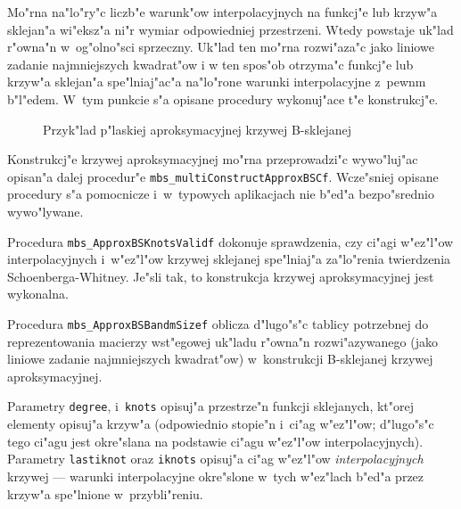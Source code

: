 \begin{sloppypar}
Mo"rna na"lo"ry"c liczb"e warunk"ow interpolacyjnych na funkcj"e lub krzyw"a
sklejan"a wi"eksz"a ni"r wymiar odpowiedniej przestrzeni. Wtedy powstaje
uk"lad r"owna"n w~og"olno"sci sprzeczny. Uk"lad ten mo"rna rozwi"aza"c jako
liniowe zadanie najmniejszych kwadrat"ow i w ten spos"ob otrzyma"c funkcj"e
lub krzyw"a sklejan"a spe"lniaj"ac"a na"lo"rone warunki interpolacyjne
z~pewnm b"l"edem. W~tym punkcie s"a opisane procedury wykonuj"ace t"e
konstrukcj"e.
\end{sloppypar}

\begin{figure}[ht]
  \centerline{}
  \caption{Przyk"lad p"laskiej aproksymacyjnej krzywej B-sklejanej}
\end{figure}
Konstrukcj"e krzywej aproksymacyjnej mo"rna przeprowadzi"c wywo"luj"ac
opisan"a dalej procedur"e \texttt{mbs\_multiConstructApproxBSCf}. Wcze"sniej
opisane procedury s"a pomocnicze i~w~typowych aplikacjach nie b"ed"a
bezpo"srednio wywo"lywane.

\vspace{\bigskipamount}
\begin{sloppypar}
Procedura \texttt{mbs\_ApproxBSKnotsValidf} dokonuje sprawdzenia, czy ci"agi
w"ez\-"l"ow interpolacyjnych i~w"ez"l"ow krzywej sklejanej spe"lniaj"a
za"lo"renia twierdzenia Schoenberga-Whitney. Je"sli tak, to konstrukcja
krzywej aproksymacyjnej jest wykonalna.
\end{sloppypar}

\vspace{\bigskipamount}
Procedura \texttt{mbs\_ApproxBSBandmSizef} oblicza d"lugo"s"c tablicy
potrzebnej do reprezentowania macierzy wst"egowej uk"ladu r"owna"n
rozwi"azywanego (jako liniowe zadanie najmniejszych kwadrat"ow)
w~konstrukcji B-sklejanej krzywej aproksymacyjnej.

Parametry \texttt{degree}, i~\texttt{knots} opisuj"a
przestrze"n funkcji sklejanych, kt"orej elementy opisuj"a krzyw"a
(odpowiednio stopie"n i~ci"ag w"ez"l"ow; d"lugo"s"c tego ci"agu jest
okre"slana na podstawie ci"agu w"ez"l"ow interpolacyjnych).
Parametry \texttt{lastiknot} oraz \texttt{iknots} opisuj"a ci"ag w"ez"l"ow
\emph{interpolacyjnych} krzywej --- warunki interpolacyjne okre"slone w~tych
w"ez"lach b"ed"a przez krzyw"a spe"lnione w~przybli"reniu.

